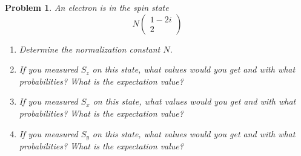 \documentclass{article}
\newtheorem{plm}{Problem}
\begin{document}
\begin{plm}
  An electron is in the spin state
  \[
    N
    \begin{pmatrix}
      1 - 2i \\
      2
    \end{pmatrix}
  \]
  \begin{enumerate}
  \item Determine the normalization constant $N$.
  \item If you measured $S_{z}$ on this state, what values would you get and with what probabilities?
    What is the expectation value?
  \item If you measured $S_{x}$ on this state, what values would you get and with what probabilities?
    What is the expectation value?
  \item If you measured $S_{y}$ on this state, what values would you get and with what probabilities?
    What is the expectation value?
  \end{enumerate}
\end{plm}
\end{document}
